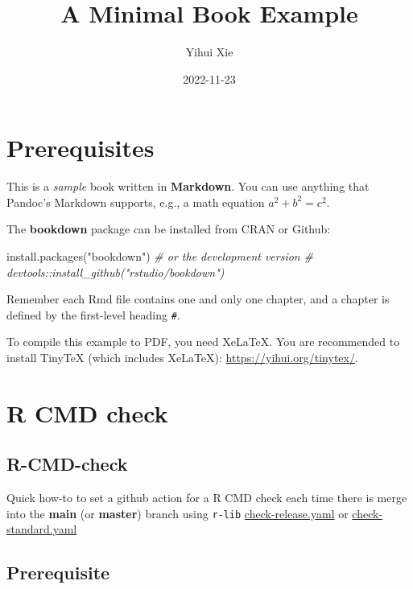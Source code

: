 \documentclass[
]{book}
\title{A Minimal Book Example}
\author{Yihui Xie}
\date{2022-11-23}
\newenvironment{Shaded}{\begin{snugshade}}{\end{snugshade}}
\newcommand{\CommentTok}[1]{\textcolor[rgb]{0.56,0.35,0.01}{\textit{#1}}}
\newcommand{\FunctionTok}[1]{\textcolor[rgb]{0.00,0.00,0.00}{#1}}
\newcommand{\NormalTok}[1]{#1}
\newcommand{\StringTok}[1]{\textcolor[rgb]{0.31,0.60,0.02}{#1}}
\begin{document}
\maketitle

{
\setcounter{tocdepth}{1}
\tableofcontents
}
\hypertarget{prerequisites}{%
\chapter{Prerequisites}\label{prerequisites}}

This is a \emph{sample} book written in \textbf{Markdown}. You can use anything that Pandoc's Markdown supports, e.g., a math equation \(a^2 + b^2 = c^2\).

The \textbf{bookdown} package can be installed from CRAN or Github:

\begin{Shaded}
\begin{Highlighting}[]
\FunctionTok{install.packages}\NormalTok{(}\StringTok{"bookdown"}\NormalTok{)}
\CommentTok{\# or the development version}
\CommentTok{\# devtools::install\_github("rstudio/bookdown")}
\end{Highlighting}
\end{Shaded}

Remember each Rmd file contains one and only one chapter, and a chapter is defined by the first-level heading \texttt{\#}.

To compile this example to PDF, you need XeLaTeX. You are recommended to install TinyTeX (which includes XeLaTeX): \url{https://yihui.org/tinytex/}.

\hypertarget{r-cmd-check}{%
\chapter{R CMD check}\label{r-cmd-check}}

\hypertarget{r-cmd-check-1}{%
\section{R-CMD-check}\label{r-cmd-check-1}}

Quick how-to to set a github action for a R CMD check each time there is merge into the \textbf{main} (or \textbf{master}) branch using \texttt{r-lib} \href{https://github.com/r-lib/actions/blob/v2-branch/examples/check-release.yaml}{check-release.yaml} or \href{https://github.com/r-lib/actions/blob/v2-branch/examples/check-standard.yaml}{check-standard.yaml}

\hypertarget{prerequisite}{%
\section{Prerequisite}\label{prerequisite}}
\end{document}
